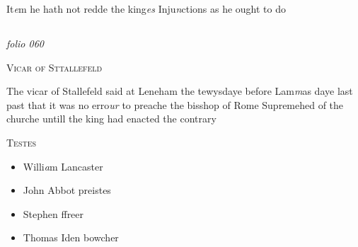\documentclass[12pt, a4paper]{book}
\begin{document}
	
			
	
		\ifthenelse{\isodd{\thepage}}
		{\reversemarginpar}
		{\normalmarginpar}
		It\textit{e}m he hath not redde the king\textit{es} Inju\textit{n}ctions as he ought to do



\dotfill
					  \subsection*{}

\textit{folio 060}


               
                  
				\begin{center}  {\scshape Vicar of Sttallefeld}  \end{center}
			
               	
               		
				\marginpar[\vspace{0.5cm}{\textcolor{Gray}{n}}]{}
			
               		
				\marginpar[\vspace{0.5cm}{\textcolor{Gray}{the busshope of Rome}}]{}
			
               		
		\ifthenelse{\isodd{\thepage}}
		{\reversemarginpar}
		{\normalmarginpar}
		The vicar of Stallefeld said at Leneham
  the tewysdaye before Lam\textit{m}as daye last past that
               			it was no erro\textit{ur} to preache the bisshop of Rome
 Supremehed of the churche untill the king had
 enacted the contrary
               	

	\begin{center} {\scshape Testes} \end{center}\begin{itemize}
 \item[]Willi\textit{a}m Lancaster
		\item[]John Abbot preistes
		\item[]Stephen ffreer
		\item[]Thomas Iden bowcher
	\end{itemize}


				\marginpar[\vspace{0.5cm}{\textcolor{Gray}{n}}]{}
			 

            
            
\end{document}
